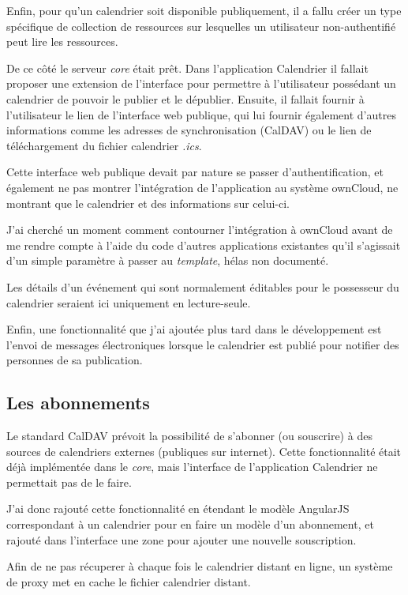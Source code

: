 \documentclass[10pt,a4paper, twoside]{report}
\begin{document}
	Enfin, pour qu'un calendrier soit disponible publiquement, il a fallu créer un type spécifique de collection de ressources sur lesquelles un utilisateur non-authentifié peut lire les ressources.
	
	De ce côté le serveur \textit{core} était prêt. Dans l'application Calendrier il fallait proposer une extension de l'interface pour permettre à l'utilisateur possédant un calendrier de pouvoir le publier et le dépublier. Ensuite, il fallait fournir à l'utilisateur le lien de l'interface web publique, qui lui fournir également d'autres informations comme les adresses de synchronisation (CalDAV) ou le lien de téléchargement du fichier calendrier \textit{.ics}.
	
	Cette interface web publique devait par nature se passer d'authentification, et également ne pas montrer l'intégration de l'application au système ownCloud, ne montrant que le calendrier et des informations sur celui-ci.
	
	J'ai cherché un moment comment contourner l'intégration à ownCloud avant de me rendre compte à l'aide du code d'autres applications existantes qu'il s'agissait d'un simple paramètre à passer au \textit{template}, hélas non documenté.
	
	Les détails d'un événement qui sont normalement éditables pour le possesseur du calendrier seraient ici uniquement en lecture-seule.
	
	Enfin, une fonctionnalité que j'ai ajoutée plus tard dans le développement est l'envoi de messages électroniques lorsque le calendrier est publié pour notifier des personnes de sa publication.
	
	\subsection{Les abonnements}
	Le standard CalDAV prévoit la possibilité de s'abonner (ou souscrire) à des sources de calendriers externes (publiques sur internet). Cette fonctionnalité était déjà implémentée dans le \textit{core}, mais l'interface de l'application Calendrier ne permettait pas de le faire. 
	
	J'ai donc rajouté cette fonctionnalité en étendant le modèle AngularJS correspondant à un calendrier pour en faire un modèle d'un abonnement, et rajouté dans l'interface une zone pour ajouter une nouvelle souscription. 
	
	Afin de ne pas récuperer à chaque fois le calendrier distant en ligne, un système de proxy met en cache le fichier calendrier distant.
	
\end{document}
